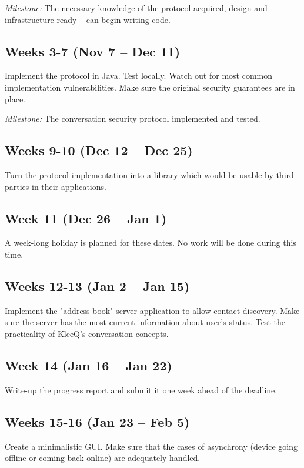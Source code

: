 \documentclass[a4paper, twoside, 12pt]{report}
\begin{document}
\begin{appendices}
\vspace{0.7\baselineskip}
\noindent
\textit{Milestone:} The necessary knowledge of the protocol acquired, design and infrastructure ready -- can begin writing code.

\subsection*{Weeks 3-7 (Nov 7 -- Dec 11)}
Implement the protocol in Java. Test locally. Watch out for most common implementation vulnerabilities. Make sure the original security guarantees are in place.

\vspace{0.7\baselineskip}
\noindent
\textit{Milestone:} The conversation security protocol implemented and tested.

\subsection*{Weeks 9-10 (Dec 12 -- Dec 25)}
Turn the protocol implementation into a library which would be usable by third parties in their applications.

\subsection*{Week 11 (Dec 26 -- Jan 1)}
A week-long holiday is planned for these dates. No work will be done during this time.

\subsection*{Weeks 12-13 (Jan 2 -- Jan 15)}
Implement the "address book" server application to allow contact discovery. Make sure the server has the most current information about user's status. Test the practicality of KleeQ's conversation concepts.

\subsection*{Week 14 (Jan 16 -- Jan 22)}
Write-up the progress report and submit it one week ahead of the deadline.

\subsection*{Weeks 15-16 (Jan 23 -- Feb 5)}
Create a minimalistic GUI. Make sure that the cases of asynchrony (device going offline or coming back online) are adequately handled.


\end{appendices}
\end{document}
